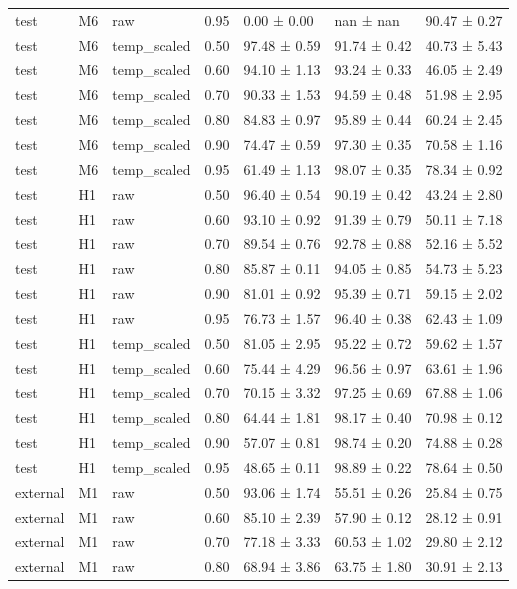 \begin{tabular}{lllrlll}
test & M6 & raw & 0.95 & 0.00 ± 0.00 & nan ± nan & 90.47 ± 0.27 \\
test & M6 & temp\_scaled & 0.50 & 97.48 ± 0.59 & 91.74 ± 0.42 & 40.73 ± 5.43 \\
test & M6 & temp\_scaled & 0.60 & 94.10 ± 1.13 & 93.24 ± 0.33 & 46.05 ± 2.49 \\
test & M6 & temp\_scaled & 0.70 & 90.33 ± 1.53 & 94.59 ± 0.48 & 51.98 ± 2.95 \\
test & M6 & temp\_scaled & 0.80 & 84.83 ± 0.97 & 95.89 ± 0.44 & 60.24 ± 2.45 \\
test & M6 & temp\_scaled & 0.90 & 74.47 ± 0.59 & 97.30 ± 0.35 & 70.58 ± 1.16 \\
test & M6 & temp\_scaled & 0.95 & 61.49 ± 1.13 & 98.07 ± 0.35 & 78.34 ± 0.92 \\
test & H1 & raw & 0.50 & 96.40 ± 0.54 & 90.19 ± 0.42 & 43.24 ± 2.80 \\
test & H1 & raw & 0.60 & 93.10 ± 0.92 & 91.39 ± 0.79 & 50.11 ± 7.18 \\
test & H1 & raw & 0.70 & 89.54 ± 0.76 & 92.78 ± 0.88 & 52.16 ± 5.52 \\
test & H1 & raw & 0.80 & 85.87 ± 0.11 & 94.05 ± 0.85 & 54.73 ± 5.23 \\
test & H1 & raw & 0.90 & 81.01 ± 0.92 & 95.39 ± 0.71 & 59.15 ± 2.02 \\
test & H1 & raw & 0.95 & 76.73 ± 1.57 & 96.40 ± 0.38 & 62.43 ± 1.09 \\
test & H1 & temp\_scaled & 0.50 & 81.05 ± 2.95 & 95.22 ± 0.72 & 59.62 ± 1.57 \\
test & H1 & temp\_scaled & 0.60 & 75.44 ± 4.29 & 96.56 ± 0.97 & 63.61 ± 1.96 \\
test & H1 & temp\_scaled & 0.70 & 70.15 ± 3.32 & 97.25 ± 0.69 & 67.88 ± 1.06 \\
test & H1 & temp\_scaled & 0.80 & 64.44 ± 1.81 & 98.17 ± 0.40 & 70.98 ± 0.12 \\
test & H1 & temp\_scaled & 0.90 & 57.07 ± 0.81 & 98.74 ± 0.20 & 74.88 ± 0.28 \\
test & H1 & temp\_scaled & 0.95 & 48.65 ± 0.11 & 98.89 ± 0.22 & 78.64 ± 0.50 \\
external & M1 & raw & 0.50 & 93.06 ± 1.74 & 55.51 ± 0.26 & 25.84 ± 0.75 \\
external & M1 & raw & 0.60 & 85.10 ± 2.39 & 57.90 ± 0.12 & 28.12 ± 0.91 \\
external & M1 & raw & 0.70 & 77.18 ± 3.33 & 60.53 ± 1.02 & 29.80 ± 2.12 \\
external & M1 & raw & 0.80 & 68.94 ± 3.86 & 63.75 ± 1.80 & 30.91 ± 2.13 \\

\end{tabular}
